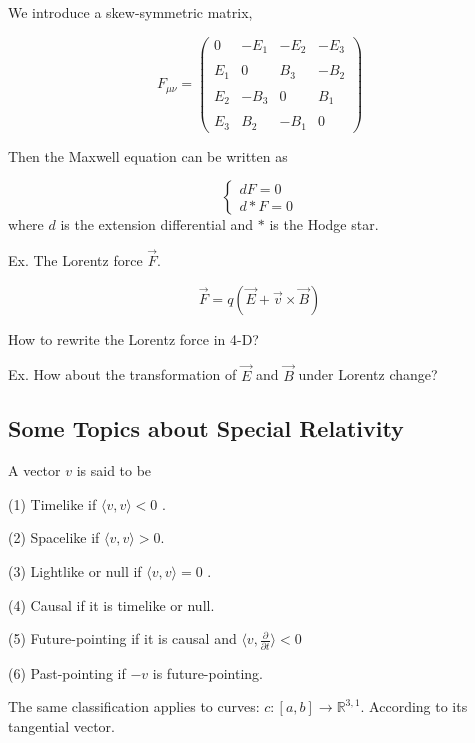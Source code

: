We introduce a skew-symmetric matrix,

\[F_{\mu\nu} = 
\begin{pmatrix}
0 & -E_1 & -E_2 & -E_3 \\ \\
E_1 & 0 & B_3 & -B_2 \\ \\
E_2 & -B_3 & 0 & B_1 \\ \\
E_3 & B_2 & -B_1 & 0
\end{pmatrix}\]

Then the Maxwell equation can be written as

\[\begin{cases}
dF = 0 \\
d*F = 0
\end{cases}\]
where \( d \) is the extension differential and \( * \) is the Hodge star.

Ex. The Lorentz force \(\vec{F}\).

\[\vec{F} = q(\vec{E} + \vec{v} \times \vec{B})\]

How to rewrite the Lorentz force in 4-D?

Ex. How about the transformation of \( \vec{E} \) and \( \vec{B} \) under Lorentz change?




\subsection{Some Topics about Special Relativity }


\begin{definition}
    A vector \( v \) is said to be  
    
(1) Timelike if \(\langle v,v\rangle<0 \)  .

(2) Spacelike if \( \langle v,v\rangle>0 \).  

(3) Lightlike or null if \( \langle v,v\rangle=0 \)  .

(4) Causal if it is timelike or null.  

(5) Future-pointing if it is causal and \( \langle v,\frac{\partial}{\partial t}\rangle<0 \)  

(6) Past-pointing if \(- v \) is future-pointing.

\end{definition}

\begin{remark}
    The same classification applies to  
curves: \( c:\left[ a,b \right] \rightarrow \mathbb{R}^{3,1} \). According to its tangential vector.
\end{remark}






